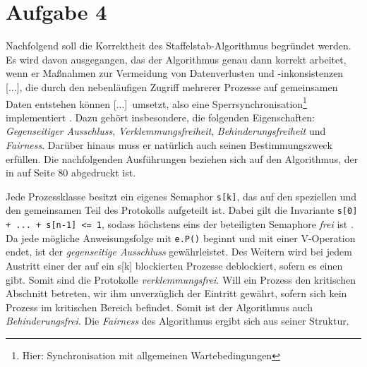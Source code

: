 \documentclass[11pt,a4paper,DIV=10,]{scrartcl}
\begin{document}
\section*{Aufgabe 4}
Nachfolgend soll die Korrektheit des Staffelstab-Algorithmus begründet werden. Es wird davon ausgegangen, das der Algorithmus genau dann korrekt arbeitet, wenn er \glqq Maßnahmen zur Vermeidung von Datenverlusten und -inkonsistenzen [...], die durch den nebenläufigen Zugriff mehrerer Prozesse auf gemeinsamen Daten entstehen können [...]\grqq\ umsetzt, also eine Sperrsynchronisation\footnote{Hier: Synchronisation mit allgemeinen Wartebedingungen} implementiert \cite[vgl.][S. 19]{Maurer.2012}. Dazu gehört insbesondere, die folgenden Eigenschaften: \textit{Gegenseitiger Ausschluss}, \textit{Verklemmungsfreiheit}, \textit{Behinderungsfreiheit} und \textit{Fairness}. Darüber hinaus muss er natürlich auch seinen Bestimmungszweck erfüllen. Die nachfolgenden Ausführungen beziehen sich auf den Algorithmus, der in \citep{Maurer.2012} auf Seite 80 abgedruckt ist.

Jede Prozessklasse besitzt ein eigenes Semaphor \texttt{s[k]}, das auf den speziellen und den gemeinsamen  Teil des Protokolls aufgeteilt ist. Dabei gilt die Invariante \texttt{s[0] + ... + s[n-1] <= 1}, sodass höchstens eins der beteiligten Semaphore \textit{frei} ist \citep[vgl.][S. 81]{Maurer.2012}.
Da jede mögliche Anweisungsfolge mit \texttt{e.P()} beginnt und mit einer V-Operation endet, ist der \textit{gegenseitige Ausschluss} gewährleistet. Des Weitern wird bei jedem Austritt einer der auf ein s[k] blockierten Prozesse deblockiert, sofern es einen gibt. Somit sind die Protokolle \textit{verklemmungsfrei}. Will ein Prozess den kritischen Abschnitt betreten, wir ihm unverzüglich der Eintritt gewährt, sofern sich kein Prozess im kritischen Bereich befindet. Somit ist der Algorithmus auch \textit{Behinderungsfrei}. Die \textit{Fairness} des Algorithmus ergibt sich aus seiner Struktur.



\end{document}
